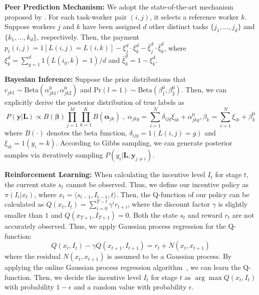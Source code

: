 \documentclass{article}
\begin{document}
\noindent \textbf{Peer Prediction Mechanism:} We adopt the state-of-the-art mechanism proposed by \cite{dasgupta2013crowdsourced}.  For each task-worker pair $(i, j)$, it selects a reference worker $k$. Suppose workers $j$ and $k$ have been assigned $d$ other distinct tasks $\{j_1,\ldots,j_d\}$ and $\{k_1,\ldots, k_d\}$, respectively. Then, the payment $p_t(i,j)= 1[L(i,j)=L(i,k)]- \xi_{j}^d\cdot \xi_{k}^d -\bar{\xi}_{j}^d\cdot \bar{\xi}_{k}^d$, where $\xi_{k}^{d}=\sum_{g=1}^{d}1(L(i_g, k)=1)/d$ and $\bar{\xi}_{k}^{d}=1-\xi_{k}^{d}$.

\noindent \textbf{Bayesian Inference:} Suppose the prior distributions that $c_{jk1}\sim \textrm{Beta}(\alpha^{0}_{jk1},\alpha^{0}_{jk2})$ and $\textrm{Pr}(l=1)\sim \textrm{Beta}(\beta^{0}_{1},\beta^{0}_{2})$. Then, we can explicitly derive the posterior distribution of true labels as
\begin{equation}
\label{PostDist}
P(\bm{y}|\bm{L})\propto B(\bm{\beta}){\prod}_{j=1}^{M}{\prod}_{k=1}^{K} B(\bm{\alpha}_{jk})\;,\; \alpha_{jkg}={\sum}_{i=1}^{N}\delta_{ijg}\xi_{ik}+\alpha^{0}_{jkg}, \beta_k={\sum}_{i=1}^{N}\xi_{ik}+\beta^{0}_{k}
\end{equation}
where $B(\cdot)$ denotes the beta function, $\delta_{ijg}=1(L(i,j)=g)$ and $\xi_{ik}= 1(y_i=k)$. According to Gibbs sampling, we can generate posterior samples via iteratively sampling $P(y_i|\bm{L}, \bm{y}_{j\neq i})$.

\noindent \textbf{Reinforcement Learning:} When calculating the incentive level $I_{t}$ for stage $t$, the current state $s_{t}$ cannot be observed. Thus, we define our incentive policy as $\pi(I_{t}|x_t)$, where $x_t=\langle s_{t-1}, I_{t-1}, t \rangle$.
Then, the Q-function of our policy can be calculated as $Q(x_t, I_t)= \sum_{i=0}^{T-t} \gamma^{i} r_{t+i}$, where the discount factor $\gamma$ is slightly smaller than $1$ and $Q(x_{T+1}, I_{T+1})=0$.
Both the state $s_t$ and reward $r_t$ are not accurately observed.
Thus, we apply Gaussian process regression for the Q-function:
\begin{equation}
\label{GaussPro}
Q(x_t, I_t) - \gamma Q(x_{t+1}, I_{t+1}) = r_t + N(x_t,x_{t+1})
\end{equation}
where the residual $N(x_t,x_{t+1})$ is assumed to be a Gaussian process. By applying the online Gaussian process regression algorithm~\cite{engel2005reinforcement}, we can learn the Q-function. Then, we decide the incentive level $I_t$ for stage $t$ as $\arg\max Q(x_t, I_t)$ with probability $1-\epsilon$ and a random value with probability $\epsilon$.
\end{document}
